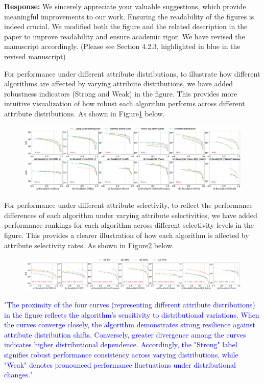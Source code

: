 \documentclass[sigconf, nonacm]{acmart}
\begin{document}
\noindent
\textbf{Response:} We sincerely appreciate your valuable suggestions, which provide meaningful improvements to our work. Ensuring the readability of the figures is indeed crucial. We modified both the figure and the related description in the paper to improve readability and ensure academic rigor. We have revised the manuscript accordingly. (Please see Section 4.2.3, highlighted in blue in the revised manuscript)

For performance under different attribute distributions, to illustrate how different algorithms are affected by varying attribute distributions, we have added robustness indicators (Strong and Weak) in the figure. This provides more intuitive visualization of how robust each algorithm performs across different attribute distributions. As shown in Figure\ref{fig:attribute_distribution} below.

\begin{figure}[htbp]
	\centering
	\includegraphics[width=\linewidth]{fig/exp_3_1.pdf}
	\caption{}
	\label{fig:attribute_distribution}
\end{figure}

For performance under different attribute selectivity, to reflect the performance differences of each algorithm under varying attribute selectivities, we have added performance rankings for each algorithm across different selectivity levels in the figure. This provides a clearer illustration of how each algorithm is affected by attribute selectivity rates. As shown in Figure\ref{fig:attribute_selectivity} below.

\begin{figure}[htbp]
	\centering
	\includegraphics[width=\linewidth]{fig/exp_5_2_1.pdf}
	\caption{}
	\label{fig:attribute_selectivity}
\end{figure}

\textcolor{blue}{"The proximity of the four curves (representing different attribute distributions) in the figure reflects the algorithm's sensitivity to distributional variations. When the curves converge closely, the algorithm demonstrates strong resilience against attribute distribution shifts. Conversely, greater divergence among the curves indicates higher distributional dependence. Accordingly, the "Strong" label signifies robust performance consistency across varying distributions, while "Weak" denotes pronounced performance fluctuations under distributional changes."}
\end{document}
